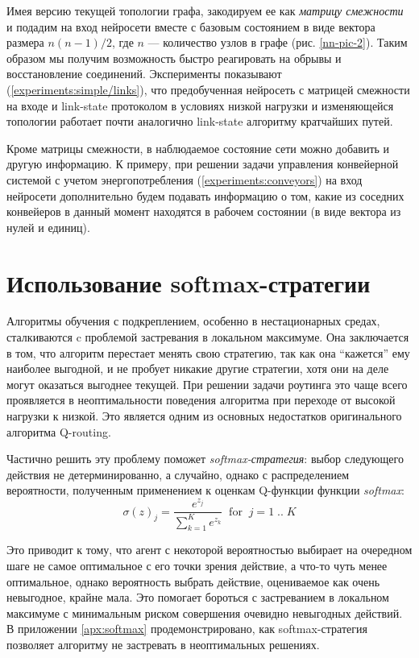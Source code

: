 \documentclass[specification, annotation]{itmo-student-thesis}
\begin{document}
Имея версию текущей топологии графа, закодируем ее как \textit{матрицу
  смежности} и подадим на вход нейросети вместе с базовым состоянием в виде
вектора размера $n(n-1)/2$, где $n$ --- количество узлов в графе (рис.
\ref{nn-pic-2}). Таким образом мы получим возможность быстро реагировать на
обрывы и восстановление соединений. Эксперименты показывают
(\ref{experiments:simple/links}), что предобученная нейросеть с матрицей
смежности на входе и link-state протоколом в условиях низкой нагрузки и
изменяющейся топологии работает почти аналогично link-state алгоритму кратчайших
путей.

Кроме матрицы смежности, в наблюдаемое состояние сети можно добавить и другую
информацию. К примеру, при решении задачи управления конвейерной системой с
учетом энергопотребления (\ref{experiments:conveyors}) на вход нейросети
дополнительно будем подавать информацию о том, какие из соседних конвейеров в
данный момент находятся в рабочем состоянии (в виде вектора из нулей и единиц).

\section{Использование softmax-стратегии}\label{algo:softmax}

Алгоритмы обучения с подкреплением, особенно в нестационарных средах,
сталкиваются c проблемой застревания в локальном максимуме. Она заключается в
том, что алгоритм перестает менять свою стратегию, так как она ``кажется'' ему
наиболее выгодной, и не пробует никакие другие стратегии, хотя они на деле могут
оказаться выгоднее текущей. При решении задачи роутинга это чаще всего
проявляется в неоптимальности поведения алгоритма при переходе от высокой
нагрузки к низкой. Это является одним из основных недостатков оригинального
алгоритма Q-routing.

Частично решить эту проблему поможет \textit{softmax-стратегия}: выбор
следующего действия не детерминированно, а случайно, однако с распределением
вероятности, полученным применением к оценкам Q-функции функции
\textit{softmax}:
\[
\sigma(z)_j = \frac{e^{z_j}}{\sum_{k=1}^K {e^{z_k}}} \; \; \mathrm{for} \; \; j
= 1 \; .. \; K
\]

Это приводит к тому, что агент с некоторой вероятностью выбирает на очередном
шаге не самое оптимальное с его точки зрения действие, а что-то чуть менее
оптимальное, однако вероятность выбрать действие, оцениваемое как очень
невыгодное, крайне мала. Это помогает бороться с застреванием в локальном
максимуме с минимальным риском совершения очевидно невыгодных действий. В
приложении \ref{apx:softmax} продемонстрировано, как softmax-стратегия позволяет
алгоритму не застревать в неоптимальных решениях.
\end{document}
